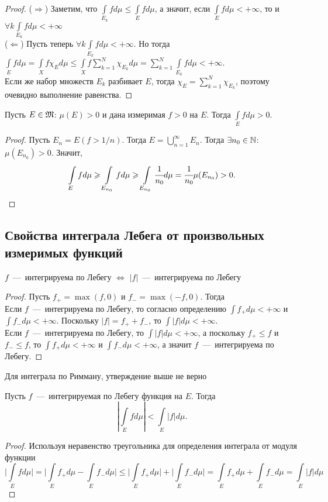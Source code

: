 \begin{proof}
    ($\Longrightarrow$) Заметим, что $\int\limits_{E_k} fd\mu \leq \int\limits_{E}fd\mu$, а значит, если $\int\limits_E fd\mu < +\infty$, то и $\forall k \int\limits_{E_k} fd\mu < +\infty$ \\
    ($\Longleftarrow$) Пусть теперь $\forall k \int\limits_{E_k} fd\mu < +\infty$. Но тогда $\int\limits_{E} fd\mu = \int\limits_X f\chi_{E}d\mu \leq \int\limits_X f\sum\limits_{k = 1}^N \chi_{E_k}d\mu = \sum\limits_{k = 1}^N \int\limits_{E_k} fd\mu < +\infty$. \\
    Если же набор множеств $E_k$ разбивает $E$, тогда $\chi_E = \sum\limits_{k = 1}^N \chi_{E_k}$, поэтому очевидно выполнение равенства.
\end{proof}
\begin{proposition}
    Пусть $E \in \MM$: $\mu(E) > 0$ и дана измеримая $f > 0$ на $E$. Тогда $\int\limits_{E} fd\mu > 0$.
\end{proposition}
\begin{proof}
    Пусть $E_n = E(f > 1/n)$. Тогда $E = \bigcup\limits_{n = 1}^\infty E_n$. Тогда $\exists n_0 \in \N$: $\mu(E_{n_0}) > 0$. Значит, \[\int\limits_{E} fd\mu \geq \int\limits_{E_{n_0}} fd\mu \geq \int\limits_{E_{n_0}} \cfrac{1}{n_0}d\mu = \cfrac{1}{n_0} \mu(E_{n_0}) > 0.\]
\end{proof}

\subsection{Свойства интеграла Лебега от произвольных измеримых функций}
\begin{proposition}
    $f$~---~интегрируема по Лебегу $\Longleftrightarrow$ $|f|$~---~интегрируема по Лебегу
\end{proposition}
\begin{proof}
    Пусть $f_+ = \max(f, 0)$ и $f_- = \max(-f, 0)$. Тогда \\
    Если $f$~---~интегрируема по Лебегу, то согласно определению $\int f_+ d\mu < +\infty$ и $\int f_-d\mu < +\infty$. Поскольку $|f| = f_+ + f_-$, то $\int |f|d\mu < +\infty$. \\
    Если $f$~---~интегрируема по Лебегу, то $\int |f|d\mu < +\infty$, а поскольку $f_+ \leq f$ и $f_- \leq f$, то $\int f_+ d\mu < +\infty$ и $\int f_- d\mu < +\infty$, а значит $f$~---~интегрируема по Лебегу.
\end{proof}
\begin{note}
    Для интеграла по Римману, утверждение выше не верно
\end{note}
\begin{proposition}
    Пусть $f$~---~интегрируемая по Лебегу функция на $E$. Тогда $$|\int\limits_E fd\mu| < \int\limits_E |f|d\mu.$$
\end{proposition}
\begin{proof} Используя неравенство треугольника для определения интеграла от модуля функции
    \[\Bigg|\int\limits_E fd\mu\Bigg| = \Bigg|\int\limits_{E} f_+d\mu - \int\limits_E f_-d\mu\Bigg| \leq \Bigg|\int\limits_E f_+d\mu\Bigg| + \Bigg|\int\limits_E f_-d\mu\Bigg| = \int\limits_E f_+d\mu + \int\limits_E f_-d\mu = \int\limits_E |f|d\mu\]
\end{proof}

